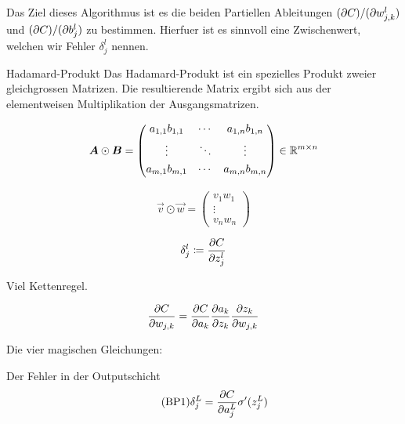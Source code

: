 \documentclass[../main]{subfiles}
\begin{document}
Das Ziel dieses Algorithmus ist es die beiden Partiellen Ableitungen
$(\partial C)/(\partial w_{j,k}^l)$ und $(\partial C)/(\partial b_j^l)$
zu bestimmen. Hierfuer ist es sinnvoll eine Zwischenwert, welchen wir Fehler
$\delta_j^l$ nennen.

\para{}
\begin{defbox}{Hadamard-Produkt}
  Das Hadamard-Produkt ist ein spezielles Produkt zweier gleichgrossen Matrizen.
  Die resultierende Matrix ergibt sich aus der elementweisen Multiplikation der Ausgangsmatrizen.

  \begin{minipage}{0.5\textwidth}
    \begin{equation*}
      \bm{A} \odot \bm{B} =
      \begin{pmatrix}
        a_{1,1} b_{1,1} & \cdots & a_{1,n} b_{1,n} \\[0.3em]
        \vdots & \ddots & \vdots \\[0.3em]
        a_{m,1} b_{m,1} & \cdots & a_{m,n} b_{m,n} \\[0.3em]
      \end{pmatrix}
      \in \mathbb{R}^{m \times n}
    \end{equation*}
  \end{minipage}
  \begin{minipage}{0.5\textwidth}
    \begin{equation*}
      \vec{v} \odot \vec{w} =
      \begin{pmatrix}
        v_1 w_1 \\
        \vdots \\
        v_n w_n
      \end{pmatrix}
    \end{equation*}

  \end{minipage}
\end{defbox}
\para{}

\begin{equation}
  \delta_j^l \coloneqq \frac{\partial C}{\partial z_j^l}
\end{equation}

Viel Kettenregel.

\begin{equation}
  \frac{\partial C}{\partial w_{j,k}} = \frac{\partial C}{\partial a_k} \frac{\partial a_k}{\partial z_k} \frac{\partial z_k}{\partial w_{j,k}}
\end{equation}

Die vier magischen Gleichungen:

Der Fehler in der Outputschicht
\begin{equation}\tag{BP1}
  \delta_j^L = \frac{\partial C}{\partial a_j^L} \sigma'(z_j^L)
\end{equation}
\end{document}
